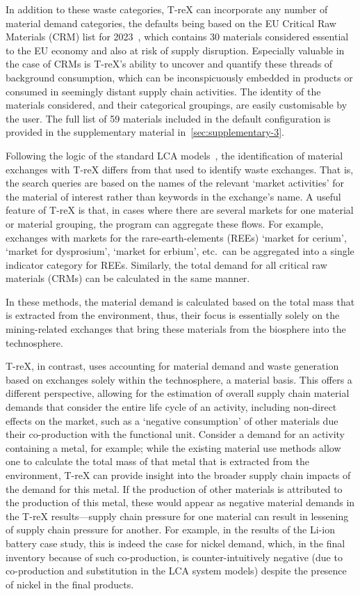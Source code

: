 \documentclass[a4paper,fleqn]{cas-dc}
\begin{document}
In addition to  these waste categories, T-reX can incorporate any number of
material demand categories, the defaults being based on the EU Critical Raw
Materials (CRM) list for 2023~\citep{eu2023crmstudy}, which contains 30
materials considered essential to the EU economy and also at risk of supply
disruption. Especially valuable in the case of CRMs is T-reX's ability to
uncover and quantify these threads of background consumption, which can be
inconspicuously embedded in products or consumed in seemingly distant supply
chain activities. The identity of the materials  considered, and their
categorical  groupings, are easily customisable by the  user. The full list of 59
materials included in the default configuration is provided in the
supplementary material  in~\autoref{sec:supplementary-3}.

Following the logic  of the standard LCA models~\cite{ecoinvent2016version3, guinee2004economicallocation},
 the identification of material exchanges with
T-reX differs from that used to identify waste  exchanges. That is, the search
queries are based on the names of the relevant `market activities' for the
material of interest rather than keywords in the exchange's name. A useful
feature of T-reX is that, in cases where there are several markets for one
material or material  grouping, the program can aggregate these flows. For
example, exchanges with markets for the rare-earth-elements (REEs) `market for
cerium', `market for dysprosium', `market for erbium', etc.\ can be aggregated
into a single indicator category for REEs. Similarly, the total demand for all
critical raw materials (CRMs) can be calculated in the same manner.

In these methods, the material demand is calculated based on the total mass
that is extracted from the environment, thus, their focus is essentially solely
on the mining-related exchanges that bring these materials from the biosphere
into the technosphere.

T-reX, in contrast, uses accounting for material demand and waste generation
based on exchanges solely within the  technosphere, a material basis. This
offers a different perspective, allowing for the estimation of overall supply
chain material demands that consider the entire life cycle of an activity,
including non-direct  effects on the  market, such as  a `negative consumption' of
other  materials due their co-production with the functional unit. Consider a
demand for an activity containing a metal, for example; while the existing
material use methods allow one to calculate the total mass of that metal that
is extracted from the environment, T-reX can provide insight into the broader
supply chain impacts of the demand for this metal. If the production of other
materials is attributed to the production of this metal, these would appear as
negative material demands in the T-reX results---supply chain pressure for one
material can result in lessening of supply chain pressure for another.  For
example, in the results of the Li-ion battery case  study, this is indeed the
case for nickel demand, which, in the final inventory because of such
co-production, is counter-intuitively negative (due to co-production and
substitution in the LCA system models) despite the presence of nickel in the
final products.
\end{document}

